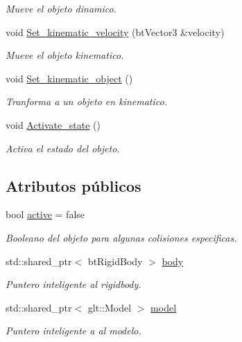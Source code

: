 \begin{DoxyCompactItemize}
\begin{DoxyCompactList}\small\item\em Mueve el objeto dinamico. \end{DoxyCompactList}\item 
void \mbox{\hyperlink{classbullet_1_1_game_object_ad8a2ae02e95c6ba340be8881417cb9a2}{Set\+\_\+kinematic\+\_\+velocity}} (bt\+Vector3 \&velocity)
\begin{DoxyCompactList}\small\item\em Mueve el objeto kinematico. \end{DoxyCompactList}\item 
void \mbox{\hyperlink{classbullet_1_1_game_object_a68d55afbaae12acbedc24ca8c7b373ef}{Set\+\_\+kinematic\+\_\+object}} ()
\begin{DoxyCompactList}\small\item\em Tranforma a un objeto en kinematico. \end{DoxyCompactList}\item 
void \mbox{\hyperlink{classbullet_1_1_game_object_a2cc828228600aeb426d17ad1de6cccdf}{Activate\+\_\+state}} ()
\begin{DoxyCompactList}\small\item\em Activa el estado del objeto. \end{DoxyCompactList}\end{DoxyCompactItemize}
\subsection*{Atributos públicos}
\begin{DoxyCompactItemize}
\item 
bool \mbox{\hyperlink{classbullet_1_1_game_object_a04aa167fbe80192ced647543c3e28e7d}{active}} = false
\begin{DoxyCompactList}\small\item\em Booleano del objeto para algunas colisiones especificas. \end{DoxyCompactList}\item 
std\+::shared\+\_\+ptr$<$ bt\+Rigid\+Body $>$ \mbox{\hyperlink{classbullet_1_1_game_object_a4e052c0aaac34a096654a14d04361b01}{body}}
\begin{DoxyCompactList}\small\item\em Puntero inteligente al rigidbody. \end{DoxyCompactList}\item 
std\+::shared\+\_\+ptr$<$ glt\+::\+Model $>$ \mbox{\hyperlink{classbullet_1_1_game_object_ae71680005e5766a0f16617ad6c84ba5b}{model}}
\begin{DoxyCompactList}\small\item\em Puntero inteligente a al modelo. \end{DoxyCompactList}\end{DoxyCompactItemize}


